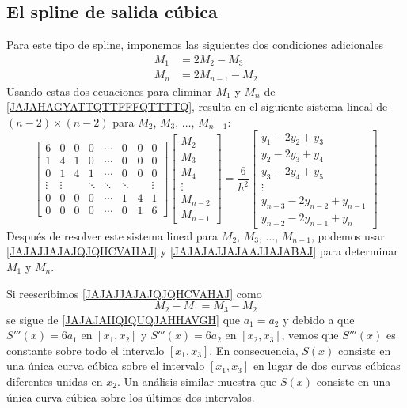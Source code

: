 \subsection*{El spline de salida cúbica}

Para este tipo de spline, imponemos las siguientes dos condiciones adicionales
\begin{align}
    M_1 & = 2M_2 - M_3 \label{JAJAJJAJAJQJQHCVAHAJ} \\
    M_n & = 2M_{n-1} - M_2 \label{JAJAJAJJAJAAJJAJABAJ}
\end{align}
Usando estas dos ecuaciones para eliminar $M_1$ y $M_n$ de \eqref{JAJAHAGYATTQTTFFFQTTTTQ}, resulta en el siguiente sistema lineal de $(n - 2) \times (n - 2)$ para $M_2$, $M_3$, $\dots$, $M_{n-1}$:
$$\begin{bmatrix}
    6 & 0 & 0 & 0 & \cdots & 0 & 0 & 0 \\
    1 & 4 & 1 & 0 & \cdots & 0 & 0 & 0 \\
    0 & 1 & 4 & 1 & \cdots & 0 & 0 & 0 \\
    \vdots & \vdots & & \ddots & \ddots & \ddots & & \vdots \\
    0 & 0 & 0 & 0 & \cdots & 1 & 4 & 1 \\
    0 & 0 & 0 & 0 & \cdots & 0 & 1 & 6
\end{bmatrix} \begin{bmatrix}
    M_2 \\
    M_3 \\
    M_4 \\
    \vdots \\
    M_{n-2} \\
    M_{n-1}
\end{bmatrix} = \frac{6}{h^2} \begin{bmatrix}
    y_1 - 2y_2 + y_3 \\
    y_2 - 2y_3 + y_4 \\
    y_3 - 2y_4 + y_5 \\
    \vdots \\
    y_{n-3} - 2y_{n-2} + y_{n-1} \\
    y_{n-2} - 2y_{n-1} + y_n
\end{bmatrix}$$
Después de resolver este sistema lineal para $M_2$, $M_3$, $\dots$, $M_{n-1}$, podemos usar \eqref{JAJAJJAJAJQJQHCVAHAJ} y \eqref{JAJAJAJJAJAAJJAJABAJ} para determinar $M_1$ y $M_n$.

Si reescribimos \eqref{JAJAJJAJAJQJQHCVAHAJ} como
$$M_2 - M_1 = M_3 - M_2$$
se sigue de \eqref{JAJAJAIIQIQUQJAHHAVGH} que $a_1 = a_2$ y debido a que $S'''(x) = 6a_1$ en $[x_1, x_2]$ y $S'''(x) = 6a_2$ en $[x_2, x_3]$, vemos que $S'''(x)$ es constante sobre todo el intervalo $[x_1, x_3]$. En consecuencia, $S(x)$ consiste en una única curva cúbica sobre el intervalo $[x_1, x_3]$ en lugar de dos curvas cúbicas diferentes unidas en $x_2$. Un análisis similar muestra que $S(x)$ consiste en una única curva cúbica sobre los últimos dos intervalos.

